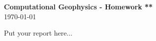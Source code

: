 \documentclass[11pt,titlepage,fleqn]{article}
\begin{document}
\begin{center}
\large {\bf Computational Geophysics - Homework **}\\
\today
\end{center}

Put your report here...

%
\end{document}
